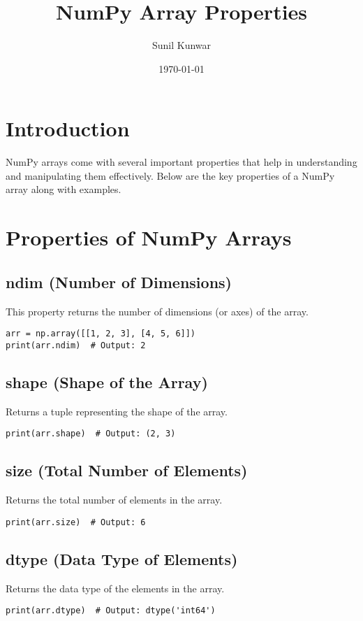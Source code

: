 \documentclass[a4paper, 12pt]{article}
\title{NumPy Array Properties}
\author{Sunil Kunwar}
\date{\today}
\begin{document}
\maketitle

\section{Introduction}
NumPy arrays come with several important properties that help in understanding and manipulating them effectively. Below are the key properties of a NumPy array along with examples.

\section{Properties of NumPy Arrays}

\subsection{ndim (Number of Dimensions)}
This property returns the number of dimensions (or axes) of the array.
\begin{lstlisting}
arr = np.array([[1, 2, 3], [4, 5, 6]])
print(arr.ndim)  # Output: 2
\end{lstlisting}

\subsection{shape (Shape of the Array)}
Returns a tuple representing the shape of the array.
\begin{lstlisting}
print(arr.shape)  # Output: (2, 3)
\end{lstlisting}

\subsection{size (Total Number of Elements)}
Returns the total number of elements in the array.
\begin{lstlisting}
print(arr.size)  # Output: 6
\end{lstlisting}

\subsection{dtype (Data Type of Elements)}
Returns the data type of the elements in the array.
\begin{lstlisting}
print(arr.dtype)  # Output: dtype('int64')
\end{lstlisting}
\end{document}
